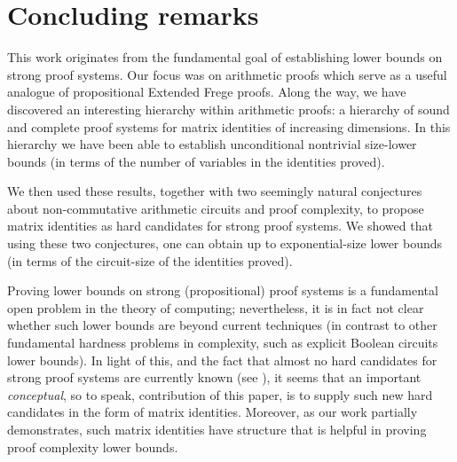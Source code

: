 \documentclass[12pt,reqno]{article}
\newcommand\F{\ensuremath{\mathbb F}}
\newcommand\PP{{\mathbb P}}
\newcommand\PMd{\ensuremath{\PP_{{\rm Mat}_d}(\F)}}
\newcommand{\matd}{{\ensuremath{{\rm Mat}_d(\F)}}}
\begin{document}
\section{Concluding remarks}
This work originates from the fundamental  goal of establishing lower bounds on strong proof systems. Our focus was on arithmetic proofs which serve as a useful \cite{HT12} analogue of propositional Extended Frege proofs. Along the way, we have discovered an interesting hierarchy within arithmetic proofs: a hierarchy of sound and complete proof systems for matrix identities of increasing dimensions. In this hierarchy we have been able to establish unconditional nontrivial size-lower bounds (in terms of the number of variables in the identities proved).

We then used these results, together with two seemingly natural conjectures about non-commutative arithmetic circuits and proof complexity, to propose matrix identities as hard candidates for strong proof systems. We showed that using these two conjectures, one can obtain up to exponential-size lower bounds (in terms of the circuit-size of the identities proved).


Proving lower bounds on strong (propositional) proof systems is a fundamental open problem in the theory of computing; nevertheless, it is in fact not clear whether such lower bounds are beyond current techniques (in contrast to other fundamental hardness problems in complexity, such as explicit Boolean circuits lower bounds). In light of this, and the fact that almost no hard candidates for strong proof systems are currently known  (see \cite{BBP95,Kra10-forcing}), it seems  that an important \textit{conceptual}, so to speak, contribution of this paper, is to supply such new hard candidates in the form of matrix identities. Moreover, as our work partially demonstrates, such matrix identities  have structure that is helpful in proving proof
complexity lower bounds.

%
%
%
%
%
\end{document}
